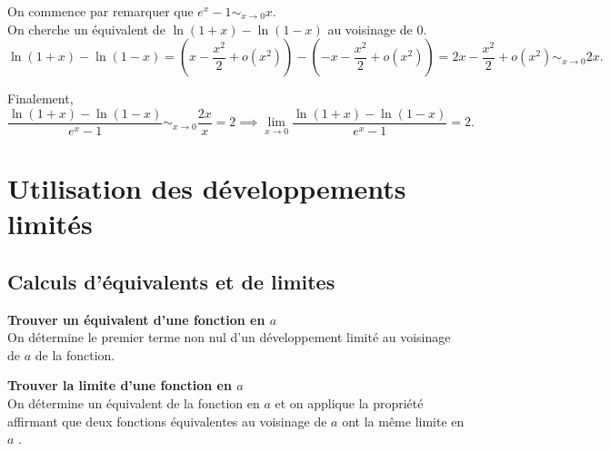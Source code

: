 
\begin{Sol} 
On commence par remarquer que $e^x - 1 \sim_{x \to 0} x$.\\

On cherche un équivalent de $\ln(1 + x) - \ln(1 - x)$ au voisinage de 0.\\
\[
\ln(1 + x) - \ln(1 - x) = (x - \frac{x^2}{2} + o(x^2)) - (-x - \frac{x^2}{2} + o(x^2)) = 2x - \frac{x^2}{2} + o(x^2) \sim_{x \to 0} 2x.
\]

Finalement,
\[
\frac{\ln(1 + x) - \ln(1 - x)}{e^x - 1} \sim_{x \to 0} \frac{2x}{x} = 2 \implies \lim_{x \to 0} \frac{\ln(1 + x) - \ln(1 - x)}{e^x - 1} = 2.
\]
\end{Sol}


\section{Utilisation des développements limités}

\subsection{Calculs d’équivalents et de limites}



\begin{Meth}\textbf{Trouver un équivalent d’une fonction en \(a\)}\\

On détermine le premier terme non nul d’un développement limité au voisinage de $a$ de la fonction.

\end{Meth}




\begin{Meth}\textbf{Trouver la limite d’une fonction en \(a\)}\\

On détermine un équivalent de la fonction en \(a\) et on applique la propriété affirmant que deux fonctions équivalentes au voisinage de \(a\) ont la même limite en \(a\) .\\
\end{Meth}




